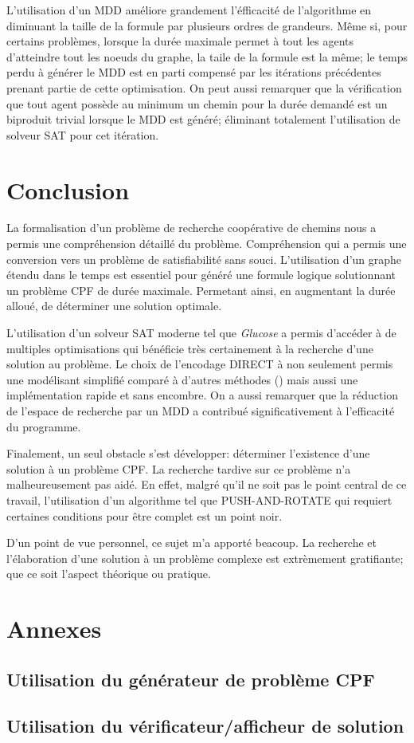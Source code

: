 \documentclass[french, 10pt, letterpaper]{article}
\theoremstyle{definition}
\theoremstyle{proposition}
\theoremstyle{example}
\begin{document}
    L'utilisation d'un MDD améliore grandement l'éfficacité de l'algorithme en diminuant la taille de la formule par plusieurs
    ordres de grandeurs. Même si, pour certains problèmes, lorsque la durée maximale permet à tout les agents d'atteindre tout les noeuds
    du graphe, la taile de la formule est la même; le temps perdu à générer le MDD est en parti compensé par les itérations précédentes
    prenant partie de cette optimisation. On peut aussi remarquer que la vérification que tout agent possède au minimum un chemin pour 
    la durée demandé est un biproduit trivial lorsque le MDD est généré; éliminant totalement l'utilisation de solveur SAT pour cet itération. 

    \newpage
    \section*{Conclusion}

    La formalisation d'un problème de recherche coopérative de chemins nous a permis une compréhension détaillé du problème.
    Compréhension qui a permis une conversion vers un problème de satisfiabilité sans souci. L'utilisation d'un graphe étendu dans
    le temps est essentiel pour généré une formule logique solutionnant un problème CPF de durée maximale. 
    Permetant ainsi, en augmentant la durée alloué, de déterminer une solution optimale.

    L'utilisation d'un solveur SAT moderne tel que \emph{Glucose} a permis d'accéder à de multiples optimisations qui bénéficie très certainement
    à la recherche d'une solution au problème. Le choix de l'encodage DIRECT à non seulement permis une modélisant simplifié comparé à d'autres
    méthodes (\cite{PSUR16}) mais aussi une implémentation rapide et sans encombre. On a aussi remarquer que la réduction de l'espace
    de recherche par un MDD a contribué significativement à l'efficacité du programme.

    Finalement, un seul obstacle s'est développer: déterminer l'existence d'une solution à un problème CPF. La recherche tardive sur ce problème
    n'a malheureusement pas aidé. En effet, malgré qu'il ne soit pas le point central de ce travail, l'utilisation d'un algorithme tel que
    PUSH-AND-ROTATE \cite{WILDEPAR} qui requiert certaines conditions pour être complet est un point noir. 

    D'un point de vue personnel, ce sujet m'a apporté beacoup. La recherche et l'élaboration d'une solution à un problème complexe est 
    extrèmement gratifiante; que ce soit l'aspect théorique ou pratique.

    
    \newpage
    

    \section*{Annexes}

    \subsection*{Utilisation du générateur de problème CPF}
    \label{anx:generator}
    \subsection*{Utilisation du vérificateur/afficheur de solution}
    \label{anx:verifier}
\end{document}
